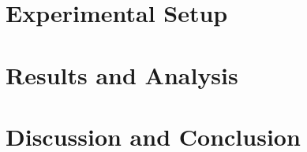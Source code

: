 \documentclass[10.5pt, a4paper]{report}
\begin{document}
\chapter{Experimental Setup}\label{chapter:experimental_setup}

\chapter{Results and Analysis}\label{chapter:results}

\chapter{Discussion and Conclusion} \label{chapter:conclusion}



\printbibliography


\appendix



\newcommand{\SH}[1]{{\small\textcolor{blue}{[NOTE: #1]}}}
\end{document}
